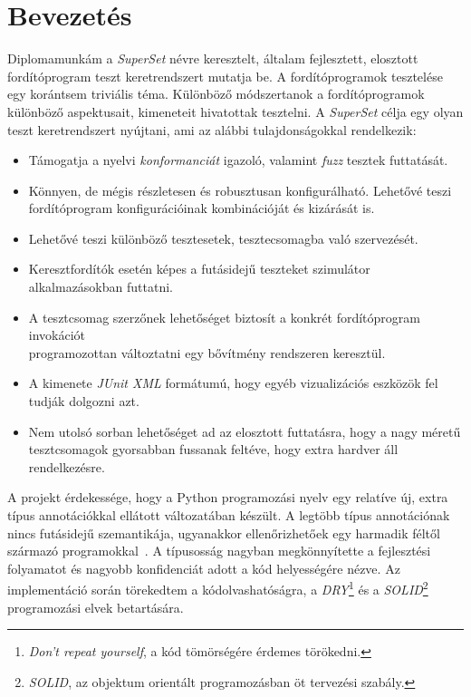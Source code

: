 \chapter{Bevezetés}

Diplomamunkám a \textit{SuperSet} névre keresztelt, általam fejlesztett, elosztott fordítóprogram teszt keretrendszert
mutatja be. A fordítóprogramok tesztelése egy korántsem triviális téma. Különböző módszertanok a fordítóprogramok
különböző aspektusait, kimeneteit hivatottak tesztelni. A \textit{SuperSet} célja egy olyan teszt keretrendszert
nyújtani, ami az alábbi tulajdonságokkal rendelkezik:

\begin{itemize}
    \item Támogatja a nyelvi \emph{konformanciát} igazoló, valamint \emph{fuzz} tesztek futtatását.
    \item Könnyen, de mégis részletesen és robusztusan konfigurálható. Lehetővé teszi fordítóprogram konfigurációinak
          kombinációját és kizárását is.
    \item Lehetővé teszi különböző tesztesetek, tesztecsomagba való szervezését.
    \item Keresztfordítók esetén képes a futásidejű teszteket szimulátor alkalmazásokban futtatni.
    \item A tesztcsomag szerzőnek lehetőséget biztosít a konkrét fordítóprogram invokációt \\ programozottan
          változtatni egy bővítmény rendszeren keresztül.
    \item A kimenete \textit{JUnit XML} formátumú, hogy egyéb vizualizációs eszközök fel tudják dolgozni azt.
    \item Nem utolsó sorban lehetőséget ad az elosztott futtatásra, hogy a nagy méretű tesztcsomagok gyorsabban
          fussanak feltéve, hogy extra hardver áll rendelkezésre.
\end{itemize}

A projekt érdekessége, hogy a Python programozási nyelv egy relatíve új, extra típus annotációkkal ellátott
változatában készült. A legtöbb típus annotációnak nincs futásidejű szemantikája, ugyanakkor ellenőrizhetőek egy
harmadik féltől származó programokkal~\cites{mypy,pyright,ty}. A típusosság nagyban megkönnyítette a fejlesztési
folyamatot és nagyobb konfidenciát adott a kód helyességére nézve. Az implementáció során törekedtem a
kódolvashatóságra, a \textit{DRY}\footnote{\textit{\foreignlanguage{american}{Don't repeat yourself}}, a kód
tömörségére érdemes törökedni.} és a \textit{SOLID}\footnote{\textit{SOLID}, az objektum orientált programozásban öt
tervezési szabály.} programozási elvek betartására.

